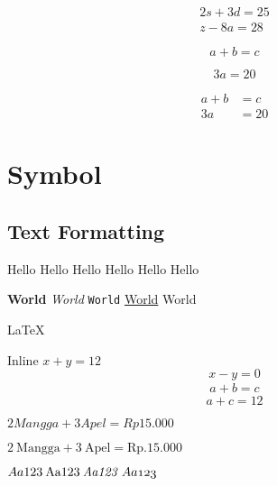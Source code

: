 \documentclass{article}
\begin{document}


    \begin{align*}
        2s + 3d = 25\\
        z - 8a = 28 
    \end{align*}

    \begin{equation*}
        a + b = c
    \end{equation*}

    \begin{equation*}
        3a = 20
    \end{equation*}

    \begin{align*}
        a + b &= c\\
        3a &= 20 
    \end{align*}

    \newpage
    \section{Symbol}
    \subsection{Text Formatting}

    {\tiny Hello} {\small Hello}
    {\normalsize Hello} Hello
    {\large Hello} {\huge Hello}

    \textbf{World}
    \textit{World}
    \texttt{World}
    \underline{World}
    \textrm{World}

    \LaTeX

    Inline $x + y = 12$
    \begin{equation}
        x - y = 0
    \end{equation}
    \begin{align}
        a + b = c
    \end{align}
    $$a + c = 12$$

    $2 Mangga + 3 Apel = Rp 15.000$

    $2 \: \textrm{Mangga} + 3 \: \textrm{Apel} 
    = \textrm{Rp.} 15.000$

    $Aa123 \: \mathrm{Aa123} \:
    \mathit{Aa123} \: \mathnormal{Aa123}$
\end{document}
